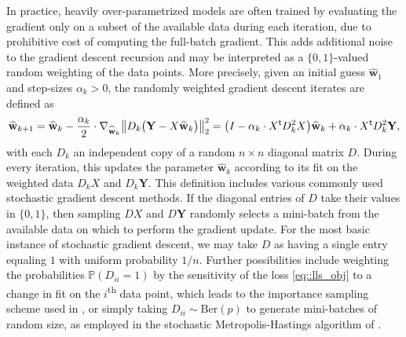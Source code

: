 \documentclass{article}
\newcommand*{\bbP}{\mathbb{P}}
\newcommand*{\bfY}{\mathbf{Y}}
\newcommand*{\bfw}{\mathbf{w}}
\newcommand*{\tran}{^{\mathsf{t}}}
\DeclarePairedDelimiter{\norm}{\lVert}{\rVert}
\newcommand*{\Ber}{\mathrm{Ber}}
\newcommand{\whweight}{\widehat{\bfw}}
\begin{document}
In practice, heavily over-parametrized models are often trained by evaluating
the gradient only on a subset of the available data during each iteration, due
to prohibitive cost of computing the full-batch gradient. This adds additional
noise to the gradient descent recursion and may be interpreted as a $\{0,
1\}$-valued random weighting of the data points. More precisely, given an
initial guess $\whweight_1$ and step-sizes $\alpha_k > 0$, the randomly weighted
gradient descent iterates are defined as \begin{align}
  \label{eq::wgd_def}
  \whweight_{k + 1} = \whweight_k - \dfrac{\alpha_k}{2} \cdot
  \nabla_{\whweight_k} \norm[\big]{D_k \big(\bfY - X \whweight_k\big)}_2^2 =
  \big(I - \alpha_k \cdot X\tran D_k^2 X\big) \whweight_k + \alpha_k \cdot
  X\tran D_k^2 \bfY,
\end{align} with each $D_k$ an independent copy of a random $n \times n$
diagonal matrix $D$. During every iteration, this updates the parameter
$\whweight_k$ according to its fit on the weighted data $D_k X$ and $D_k \bfY$.
This definition includes various commonly used stochastic gradient descent
methods. If the diagonal entries of $D$ take their values in $\{0, 1\}$, then
sampling $D X$ and $D \bfY$ randomly selects a mini-batch from the available
data on which to perform the gradient update. For the most basic instance of
stochastic gradient descent, we may take $D$ as having a single entry equaling
$1$ with uniform probability $1 / n$. Further possibilities include weighting
the probabilities $\bbP(D_{ii} = 1)$ by the sensitivity of the loss
\eqref{eq::lls_obj} to a change in fit on the $i$\textsuperscript{th} data
point, which leads to the importance sampling scheme used in
\cite{needell_srebro_et_al_2014}, or simply taking $D_{ii} \sim \Ber(p)$ to
generate mini-batches of random size, as employed in the stochastic
Metropolis-Hastings algorithm of \cite{bieringer_kasieczka_et_al_2023}.
\end{document}
